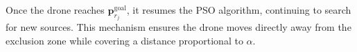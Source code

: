 Once the drone reaches \( \mathbf{p}_{r_j}^{\text{goal}} \), 
it resumes the PSO algorithm, continuing to search for new sources. 
This mechanism ensures the drone moves directly away from the 
exclusion zone while covering a distance proportional to \( \alpha \).






